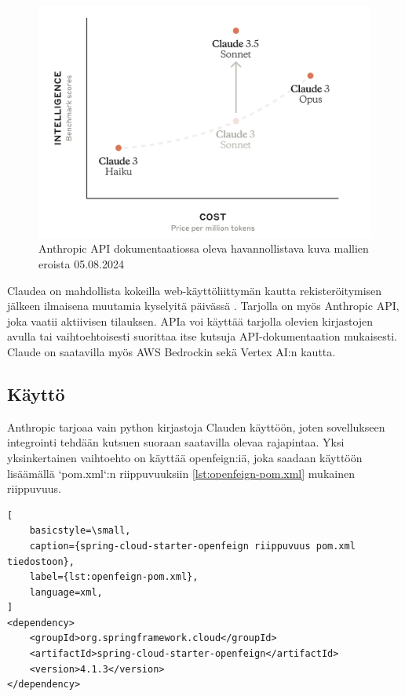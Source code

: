 \begin{figure}[H]
  \includegraphics[width=\textwidth]{figures/3-5-sonnet-curve.png}
  \caption{Anthropic API dokumentaatiossa oleva havannollistava kuva mallien eroista 05.08.2024}
  \label{fig:3-5-sonnet-curve}
\end{figure}

Claudea on mahdollista kokeilla web-käyttöliittymän kautta rekisteröitymisen
jälkeen ilmaisena muutamia kyselyitä päivässä \parencite{claudeChat}. Tarjolla
on myös Anthropic API, joka vaatii aktiivisen tilauksen. APIa voi käyttää
tarjolla olevien kirjastojen avulla tai vaihtoehtoisesti suorittaa itse kutsuja
API-dokumentaation mukaisesti. Claude on saatavilla myös AWS Bedrockin sekä
Vertex AI:n kautta. \parencite{anthropicAPIDocs}

\subsection{Käyttö}

Anthropic tarjoaa vain python kirjastoja Clauden käyttöön, joten sovellukseen
integrointi tehdään kutsuen suoraan saatavilla olevaa rajapintaa. Yksi
yksinkertainen vaihtoehto on käyttää openfeign:iä, joka saadaan käyttöön
lisäämällä `pom.xml`:n riippuvuuksiin \ref{lst:openfeign-pom.xml} mukainen
riippuvuus.

\begin{lstlisting}[
    basicstyle=\small,
    caption={spring-cloud-starter-openfeign riippuvuus pom.xml tiedostoon},
    label={lst:openfeign-pom.xml},
    language=xml,
]
<dependency>
    <groupId>org.springframework.cloud</groupId>
    <artifactId>spring-cloud-starter-openfeign</artifactId>
    <version>4.1.3</version>
</dependency>
\end{lstlisting}

